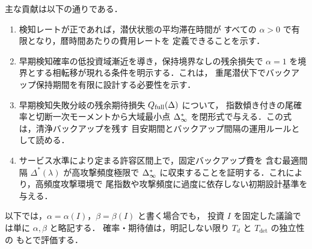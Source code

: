 主な貢献は以下の通りである．

\begin{enumerate}
  \item 検知レートが正であれば，潜伏状態の平均滞在時間が
  すべての $\alpha>0$ で有限となり，暦時間あたりの費用レートを
  定義できることを示す．
  \item 早期検知確率の低投資域漸近を導き，保持境界なしの残余損失で
  $\alpha=1$ を境界とする相転移が現れる条件を明示する．これは，
  重尾潜伏下でバックアップ保持期間を有限に設計する必要性を示す．
  \item 早期検知失敗分岐の残余期待損失 $Q_{\mathrm{full}}(\Delta)$ について，
  指数傾き付きの尾確率と切断一次モーメントから大域最小点
  $\Delta_\infty^\ast$ を閉形式で与える．この式は，清浄バックアップを残す
  目安期間とバックアップ間隔の運用ルールとして読める．
  \item サービス水準により定まる許容区間上で，固定バックアップ費を
  含む最適間隔 $\Delta^\ast(\lambda)$ が高攻撃頻度極限で
  $\Delta_\infty^\ast$ に収束することを証明する．これにより，高頻度攻撃環境で
  尾指数や攻撃頻度に過度に依存しない初期設計基準を与える．
\end{enumerate}

以下では，$\alpha=\alpha(I)$，$\beta=\beta(I)$ と書く場合でも，
投資 $I$ を固定した議論では単に $\alpha,\beta$ と略記する．
確率・期待値は，明記しない限り $T_d$ と $T_{\mathrm{det}}$ の独立性の
もとで評価する．
